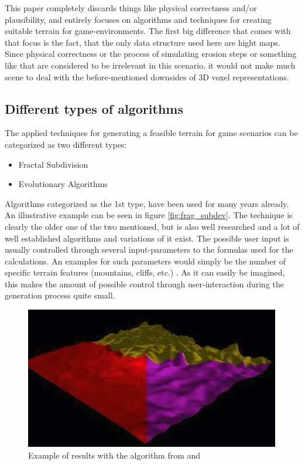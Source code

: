 This paper completely discards things like physical correctness and/or plausibility, and entirely focuses on algorithms and techniques for creating suitable terrain for game-environments. The first big difference that comes with that focus is the fact, that the only data structure used here are hight maps. Since physical correctness or the process of simulating erosion steps or something like that are considered to be irrelevant in this scenario, it would not make much scene to deal with the before-mentioned downsides of 3D voxel representations.

\subsection{Different types of algorithms}
The applied techniques for generating a feasible terrain for game scenarios can be categorized as two different types:
\begin{itemize}
	\item Fractal Subdivision 
	\item Evolutionary Algorithms
\end{itemize}

Algorithms categorized as the 1st type, have been used for many years already. An illustrative example can be seen in figure \ref{fig:frag_subdev}. The technique is clearly the older one of the two mentioned, but is also well researched and a lot of well established algorithms and variations of it exist. The possible user input is usually controlled through several input-parameters to the formulas used for the calculations. An examples for such parameters would simply be the number of specific terrain features (mountains, cliffs, etc.) \cite{raffe2012survey}. As it can easily be imagined, this makes the amount of possible control through user-interaction during the generation process quite small.

\begin{figure}[htb]
	\centering
	\includegraphics[width=\linewidth]{RZL12/tz76jt7ut.jpg}
	\caption{Example of results with the algorithm from \cite{ong2005terrain} and \cite{saunders2006realistic}}
	\label{fig:tag15}
\end{figure}


